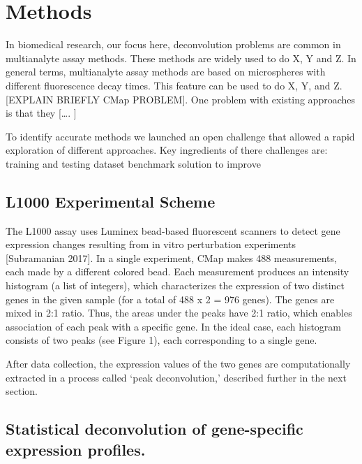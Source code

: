 \documentclass[]{article}
\begin{document}
\hypertarget{methods-1}{%
\section{Methods}\label{methods-1}}

In biomedical research, our focus here, deconvolution problems are
common in multianalyte assay methods. These methods are widely used to
do X, Y and Z. In general terms, multianalyte assay methods are based on
microspheres with different fluorescence decay times. This feature can
be used to do X, Y, and Z. {[}EXPLAIN BRIEFLY CMap PROBLEM{]}. One
problem with existing approaches is that they {[}\ldots. {]}

To identify accurate methods we launched an open challenge that allowed
a rapid exploration of different approaches. Key ingredients of there
challenges are: training and testing dataset benchmark solution to
improve

\hypertarget{l1000-experimental-scheme-1}{%
\subsection{L1000 Experimental
Scheme}\label{l1000-experimental-scheme-1}}

The L1000 assay uses Luminex bead-based fluorescent scanners to detect
gene expression changes resulting from in vitro perturbation experiments
{[}Subramanian 2017{]}. In a single experiment, CMap makes 488
measurements, each made by a different colored bead. Each measurement
produces an intensity histogram (a list of integers), which
characterizes the expression of two distinct genes in the given sample
(for a total of 488 x 2 = 976 genes). The genes are mixed in 2:1 ratio.
Thus, the areas under the peaks have 2:1 ratio, which enables
association of each peak with a specific gene. In the ideal case, each
histogram consists of two peaks (see Figure 1), each corresponding to a
single gene.

After data collection, the expression values of the two genes are
computationally extracted in a process called `peak deconvolution,'
described further in the next section.

\hypertarget{statistical-deconvolution-of-gene-specific-expression-profiles.-1}{%
\subsection{Statistical deconvolution of gene-specific expression
profiles.}\label{statistical-deconvolution-of-gene-specific-expression-profiles.-1}}
\end{document}
